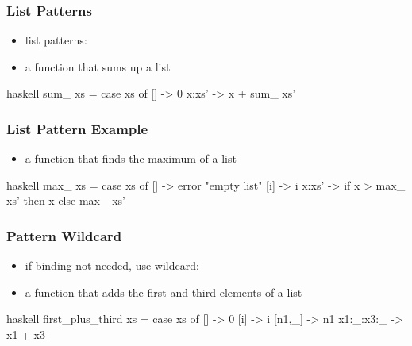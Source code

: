 \documentclass[dvipsnames]{beamer}
\theoremstyle{plain}
\begin{document}
\begin{frame}[fragile]
  \frametitle{List Patterns}

  \begin{itemize}
    \item list patterns:\\
  \end{itemize}

  \pause
  \begin{example}
    \begin{itemize}
      \item a function that sums up a list
    \end{itemize}

    \begin{pygments}{haskell}
sum_ xs =
    case xs of
      [] -> 0
      x:xs' -> x + sum_ xs'
    \end{pygments}
  \end{example}
\end{frame}

\begin{frame}[fragile]
  \frametitle{List Pattern Example}

  \begin{example}
    \begin{itemize}
      \item a function that finds the maximum of a list
    \end{itemize}

    \pause
    \begin{pygments}{haskell}
max_ xs =
    case xs of
      [] -> error "empty list"
      [i] -> i
      x:xs' -> if x > max_ xs' then x else max_ xs'
    \end{pygments}
  \end{example}
\end{frame}

\begin{frame}[fragile]
  \frametitle{Pattern Wildcard}

  \begin{itemize}
    \item if binding not needed, use wildcard: 
  \end{itemize}

  \begin{example}
    \begin{itemize}
      \item a function that adds the first and third elements of a list
    \end{itemize}

    \pause
    \begin{pygments}{haskell}
first_plus_third xs =
    case xs of
      [] -> 0
      [i] -> i
      [n1,_] -> n1
      x1:_:x3:_ -> x1 + x3
    \end{pygments}
  \end{example}
\end{frame}
\end{document}
